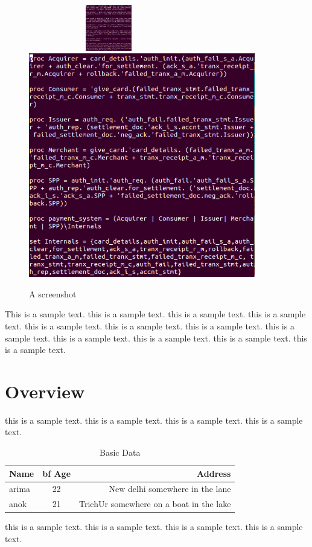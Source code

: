 \documentclass{article}
\begin{document}
\begin{figure}
\includegraphics[width=7cm,height=2cm]{pics/pic1}
\includegraphics[scale=0.4]{pics/pic1}
\caption{A screenshot}
\label{figsc}
\end{figure}

\vspace{1mm}
\noindent
This is  a sample text.
this is  a sample text.
this is  a sample text.
this is  a sample text.
this is  a sample text.
this is  a sample text.
this is  a sample text.
this is  a sample text.
this is  a sample text.
this is  a sample text.
this is  a sample text.
this is  a sample text.


\section {Overview }

this is  a sample text.
this is  a sample text.
this is  a sample text.
this is  a sample text.

\begin{table}
\caption{Basic Data}
\centering
\begin{tabular} {|l|c|r|}
\hline
{\bf Name} & {bf Age} & {\bf Address} \\ \hline \hline
arima & 22 & New delhi somewhere in the lane\\
\hline
anok & 21 & TrichUr somewhere on a boat in the lake \\
\hline
\end{tabular}
\end{table}

this is  a sample text.
this is  a sample text.
this is  a sample text.
this is  a sample text.
\end{document}
